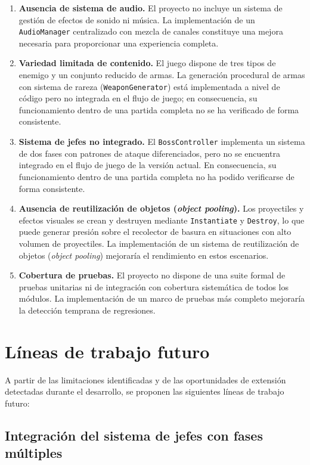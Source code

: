 \begin{enumerate}
\item \textbf{Ausencia de sistema de audio.} El proyecto no incluye un sistema de gestión de efectos de sonido ni música. La implementación de un \texttt{AudioManager} centralizado con mezcla de canales constituye una mejora necesaria para proporcionar una experiencia completa.
\item \textbf{Variedad limitada de contenido.} El juego dispone de tres tipos de enemigo y un conjunto reducido de armas. La generación procedural de armas con sistema de rareza (\texttt{WeaponGenerator}) está implementada a nivel de código pero no integrada en el flujo de juego; en consecuencia, su funcionamiento dentro de una partida completa no se ha verificado de forma consistente.
\item \textbf{Sistema de jefes no integrado.} El \texttt{BossController} implementa un sistema de dos fases con patrones de ataque diferenciados, pero no se encuentra integrado en el flujo de juego de la versión actual. En consecuencia, su funcionamiento dentro de una partida completa no ha podido verificarse de forma consistente.
\item \textbf{Ausencia de reutilización de objetos (\textit{object pooling}).} Los proyectiles y efectos visuales se crean y destruyen mediante \texttt{Instantiate} y \texttt{Destroy}, lo que puede generar presión sobre el recolector de basura en situaciones con alto volumen de proyectiles. La implementación de un sistema de reutilización de objetos (\textit{object pooling}) mejoraría el rendimiento en estos escenarios.
\item \textbf{Cobertura de pruebas.} El proyecto no dispone de una suite formal de pruebas unitarias ni de integración con cobertura sistemática de todos los módulos. La implementación de un marco de pruebas más completo mejoraría la detección temprana de regresiones.
\end{enumerate}

\section{Líneas de trabajo futuro}


A partir de las limitaciones identificadas y de las oportunidades de extensión detectadas durante el desarrollo, se proponen las siguientes líneas de trabajo futuro:

\subsection{Integración del sistema de jefes con fases múltiples}


